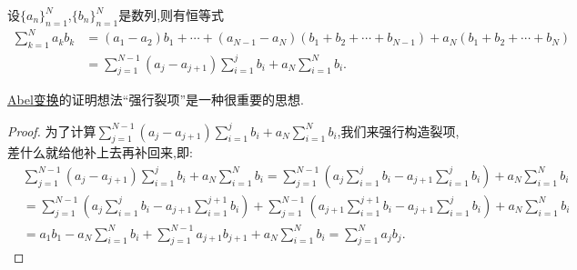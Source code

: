 \documentclass[lang=cn,newtx,10pt,scheme=chinese]{elegantbook}
\begin{document}
\begin{theorem}[Abel变换]\label{theorem:Abel变换}
设\(\{a_n\}_{n = 1}^{N}\),\(\{b_n\}_{n = 1}^{N}\)是数列,则有恒等式
\begin{align*}
\sum\limits_{k = 1}^{N} a_k b_k &= (a_1 - a_2)b_1 + \cdots + (a_{N - 1} - a_N)(b_1 + b_2 + \cdots + b_{N - 1}) + a_N(b_1 + b_2 + \cdots + b_N)
\\
&= \sum\limits_{j = 1}^{N - 1} (a_j - a_{j + 1}) \sum\limits_{i = 1}^{j} b_i + a_N \sum\limits_{i = 1}^{N} b_i.
\end{align*}
\end{theorem}
\begin{note}
\hyperref[theorem:Abel变换]{Abel变换}的证明想法“强行裂项”是一种很重要的思想.
\end{note}
\begin{proof}
为了计算\(\sum\limits_{j = 1}^{N - 1} (a_j - a_{j + 1}) \sum\limits_{i = 1}^{j} b_i + a_N \sum\limits_{i = 1}^{N} b_i\),我们来强行构造裂项,差什么就给他补上去再补回来,即:
\begin{align*}
&\sum\limits_{j = 1}^{N - 1} (a_j - a_{j + 1}) \sum\limits_{i = 1}^{j} b_i + a_N \sum\limits_{i = 1}^{N} b_i = \sum\limits_{j = 1}^{N - 1} \left(a_j \sum\limits_{i = 1}^{j} b_i - a_{j + 1} \sum\limits_{i = 1}^{j} b_i\right) + a_N \sum\limits_{i = 1}^{N} b_i
\\
&= \sum\limits_{j = 1}^{N - 1} \left(a_j \sum\limits_{i =1}^{j} b_i - a_{j + 1} \sum\limits_{i = 1}^{j + 1} b_i\right) + \sum\limits_{j = 1}^{N - 1} \left(a_{j + 1} \sum\limits_{i = 1}^{j + 1} b_i - a_{j + 1} \sum\limits_{i = 1}^{j} b_i\right) + a_N \sum\limits_{i = 1}^{N} b_i
\\
&= a_1 b_1 - a_N \sum\limits_{i = 1}^{N} b_i + \sum\limits_{j = 1}^{N - 1} a_{j + 1} b_{j + 1} + a_N \sum\limits_{i = 1}^{N} b_i
= \sum\limits_{j = 1}^{N} a_j b_j.
\end{align*}
\end{proof}
\end{document}

